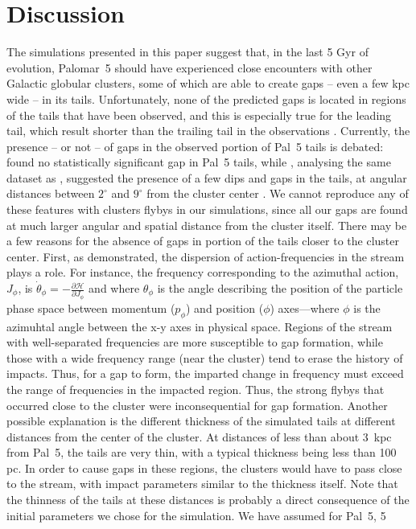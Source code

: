 \documentclass[draft]{aa}
\begin{document}
  
  
\section{Discussion}
  
  The simulations presented in this paper suggest that, in the last 5 Gyr of evolution, Palomar~5 should have experienced close encounters with other Galactic globular clusters, some of which are able to create gaps -- even a few kpc wide -- in its tails. Unfortunately, none of the predicted gaps is located in regions of the tails that have been observed, and this is especially true for the leading tail, which result shorter than the trailing tail in the observations \citep[see][for a possible explanation of this feature]{2017NatAs...1..633P}. Currently, the presence -- or not -- of gaps in the observed portion of Pal~5 tails is debated: \citet{2016ApJ...819....1I} found no statistically significant gap in Pal~5 tails, while \citet{2017MNRAS.470...60E}, analysing the same dataset as \citet{2016ApJ...819....1I}, suggested the presence of a few dips and gaps in the tails, at angular distances between $2^\circ$ and $9^\circ$ from the cluster center \citep[see also][]{ 2020ApJ...889...70B}. We cannot reproduce any of these features with clusters flybys in our simulations, since all our gaps are found at much larger angular and spatial distance from the cluster itself. There may be a few reasons for the absence of gaps in portion of the tails closer to the cluster center. First, as \citet{2016MNRAS.457.3817S} demonstrated, the dispersion of action-frequencies in the stream plays a role. For instance, the frequency corresponding to the azimuthal action, $J_\phi$, is $\dot\theta_\phi = - \frac{\mathcal{\partial H}}{\partial J_\phi}$ and where $\theta_\phi$ is the angle describing the position of the particle phase space between momentum ($p_\phi$) and position ($\phi$) axes---where $\phi$ is the azimuhtal angle between the x-y axes in physical space. Regions of the stream with well-separated frequencies are more susceptible to gap formation, while those with a wide frequency range (near the cluster) tend to erase the history of impacts. Thus, for a gap to form, the imparted change in frequency must exceed the range of frequencies in the impacted region. Thus, the strong flybys that occurred close to the cluster were inconsequential for gap formation. Another possible explanation is the different thickness of the simulated tails at different distances from the center of the cluster. At distances of less than about 3~kpc from Pal~5, the tails are very thin, with a typical thickness being less than 100 pc. In order to cause gaps in these regions, the clusters would have to pass close to the stream, with impact parameters similar to the thickness itself. Note that the thinness of the tails at these distances is probably a direct consequence of the initial parameters we chose for the simulation. We have assumed for Pal~5, 5 
\end{document}
